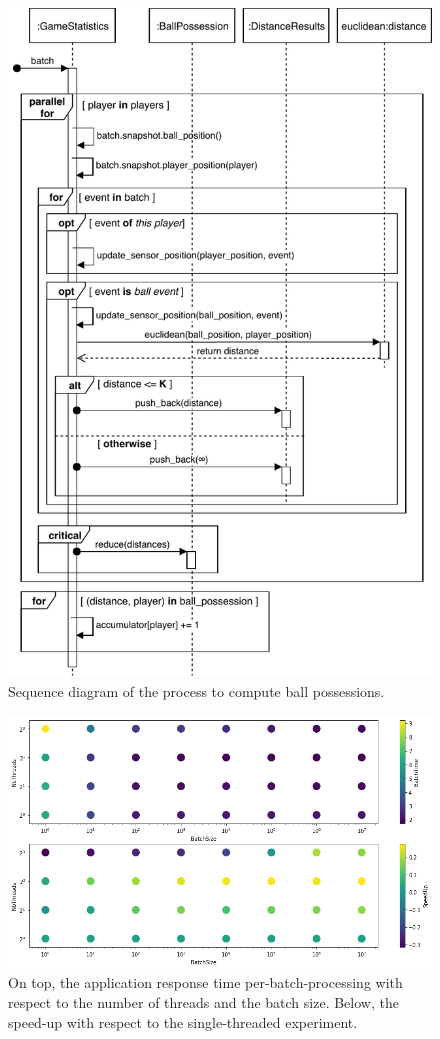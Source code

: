 \documentclass[a4paper, 11pt]{article}
\begin{document}
\begin{figure}[h]
    \centering
    \includegraphics[height=.95\textheight]{UML/accumulate_stats.pdf}
    \caption{Sequence diagram of the process to compute ball possessions.}
    \label{fig:accumulate_stats_seq}
\end{figure}
\begin{figure}[h]
    \centering
    \includegraphics[width=1\textwidth]{Performance/speedup_analysis_7_1.png}
    \caption{On top, the application response time per-batch-processing with respect to the number of threads and the batch size. Below, the speed-up with respect to the single-threaded experiment.}
    \label{fig:perf1}
\end{figure}
\end{document}
